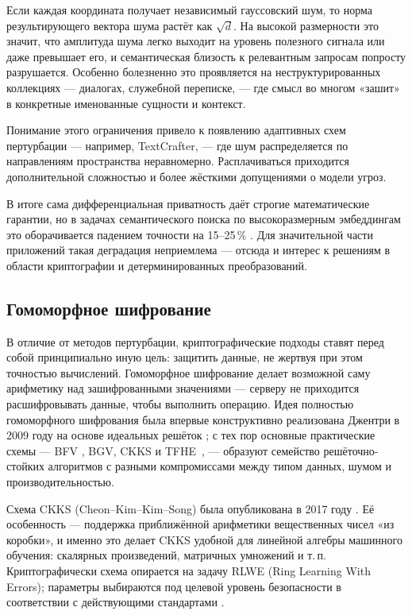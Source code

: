 \documentclass[a4paper, 12pt, oneside, openany]{article}
\begin{document}
Если каждая координата получает независимый гауссовский шум, то норма результирующего вектора шума растёт как $\sqrt{d}$. На высокой размерности это значит, что амплитуда шума легко выходит на уровень полезного сигнала или даже превышает его, и семантическая близость к релевантным запросам попросту разрушается. Особенно болезненно это проявляется на неструктурированных коллекциях — диалогах, служебной переписке, — где смысл во многом «зашит» в конкретные именованные сущности и контекст.

Понимание этого ограничения привело к появлению адаптивных схем пертурбации — например, TextCrafter, — где шум распределяется по направлениям пространства неравномерно. Расплачиваться приходится дополнительной сложностью и более жёсткими допущениями о модели угроз.

В итоге сама дифференциальная приватность даёт строгие математические гарантии, но в задачах семантического поиска по высокоразмерным эмбеддингам это оборачивается падением точности на 15--25\,\% \cite{ref55}. Для значительной части приложений такая деградация неприемлема --- отсюда и интерес к решениям в области криптографии и детерминированных преобразований.

\subsection{Го\-мо\-морф\-ное шиф\-ро\-ва\-ние}

В отличие от методов пертурбации, криптографические подходы ставят перед собой принципиально иную цель: защитить данные, не жертвуя при этом точностью вычислений. Го\-мо\-морф\-ное шиф\-ро\-ва\-ние делает возможной саму арифметику над зашифрованными значениями --- серверу не приходится расшифровывать данные, чтобы выполнить операцию. Идея полностью гомоморфного шифрования была впервые конструктивно реализована Джентри в 2009 году на основе идеальных решёток \cite{ref76}; с тех пор основные практические схемы --- BFV \cite{ref77}, BGV, CKKS \cite{ref12} и TFHE~\cite{ref78}, --- образуют семейство решёточно-стойких алгоритмов с разными компромиссами между типом данных, шумом и производительностью.

Схема CKKS (Cheon--Kim--Kim--Song) была опубликована в 2017 году \cite{ref12}. Её особенность --- поддержка приближённой арифметики вещественных чисел «из коробки», и именно это делает CKKS удобной для линейной алгебры машинного обучения: скалярных произведений, матричных умножений и т.\,п. Криптографически схема опирается на задачу RLWE (Ring Learning With Errors); параметры выбираются под целевой уровень безопасности в соответствии с действующими стандартами \cite{ref13}.
\end{document}
